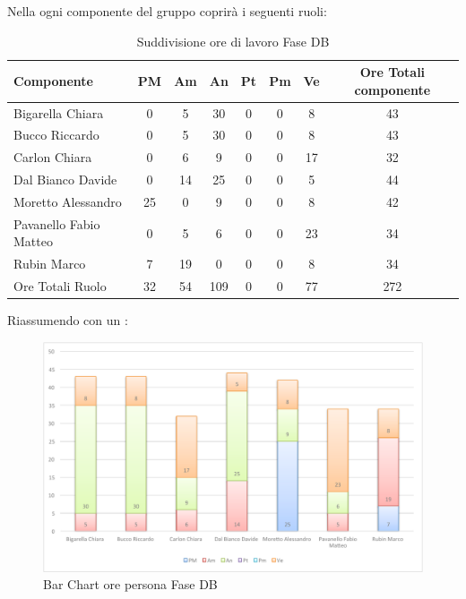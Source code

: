 				Nella  ogni componente del gruppo \groupname{} coprirà i seguenti ruoli:
				\begin{table}[H]
					\begin{center}
						\begin{tabular}{| l | c | c | c | c | c | c | c |}
							\hline
							Componente 					& PM	& Am 		& An 		& Pt 	& Pm 	& Ve 		& Ore Totali componente \\ \hline
							
							Bigarella Chiara 			& 0		& 5 		& 30 		& 0		& 0		& 8 		& 43 \\
							Bucco Riccardo 				& 0		& 5 		& 30 		& 0		& 0		& 8 		& 43 \\
							Carlon Chiara	 			& 0		& 6 		& 9 		& 0		& 0		& 17 		& 32 \\
							Dal Bianco Davide 			& 0		& 14 		& 25 		& 0		& 0		& 5 		& 44 \\
							Moretto Alessandro 			& 25 	& 0			& 9 		& 0		& 0		& 8 		& 42 \\
							Pavanello Fabio Matteo	 	& 0		& 5 		& 6 		& 0		& 0		& 23 		& 34 \\
							Rubin Marco					& 7 	& 19 		& 0			& 0		& 0		& 8 		& 34 \\ \hline \hline
							
							Ore Totali Ruolo 			& 32 	& 54 		& 109 		& 0		& 0		& 77 		& 272\\ \hline
						\end{tabular}
					\end{center}
					\caption{Suddivisione ore di lavoro Fase DB}
				\end{table}
				Riassumendo con un :
				\begin{figure}[H]\centering
					\includegraphics[width=\textwidth]{PianoDiProgetto/Pics/ChartOreFaseDB.pdf}
					\caption{Bar Chart ore persona Fase DB}
				\end{figure}

